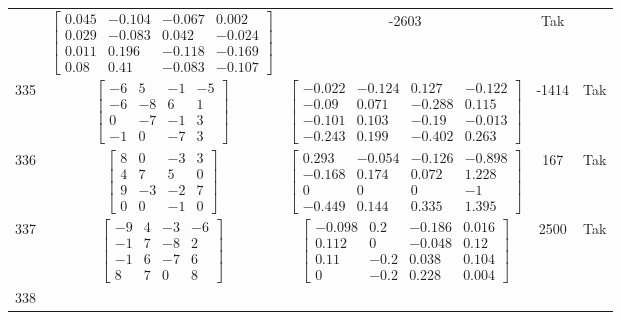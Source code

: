 \documentclass[a4paper,12pt]{article}
\begin{document}
\begin{tabular}{c c c c c}
&
$\begin{bmatrix} 0.045 & -0.104 & -0.067 & 0.002 \\ 0.029 & -0.083 & 0.042 & -0.024 \\ 0.011 & 0.196 & -0.118 & -0.169 \\ 0.08 & 0.41 & -0.083 & -0.107 \end{bmatrix}$
&
-2603
&
Tak
\\
335
&
$\begin{bmatrix} -6 & 5 & -1 & -5 \\ -6 & -8 & 6 & 1 \\ 0 & -7 & -1 & 3 \\ -1 & 0 & -7 & 3 \end{bmatrix}$
&
$\begin{bmatrix} -0.022 & -0.124 & 0.127 & -0.122 \\ -0.09 & 0.071 & -0.288 & 0.115 \\ -0.101 & 0.103 & -0.19 & -0.013 \\ -0.243 & 0.199 & -0.402 & 0.263 \end{bmatrix}$
&
-1414
&
Tak
\\
336
&
$\begin{bmatrix} 8 & 0 & -3 & 3 \\ 4 & 7 & 5 & 0 \\ 9 & -3 & -2 & 7 \\ 0 & 0 & -1 & 0 \end{bmatrix}$
&
$\begin{bmatrix} 0.293 & -0.054 & -0.126 & -0.898 \\ -0.168 & 0.174 & 0.072 & 1.228 \\ 0 & 0 & 0 & -1 \\ -0.449 & 0.144 & 0.335 & 1.395 \end{bmatrix}$
&
167
&
Tak
\\
337
&
$\begin{bmatrix} -9 & 4 & -3 & -6 \\ -1 & 7 & -8 & 2 \\ -1 & 6 & -7 & 6 \\ 8 & 7 & 0 & 8 \end{bmatrix}$
&
$\begin{bmatrix} -0.098 & 0.2 & -0.186 & 0.016 \\ 0.112 & 0 & -0.048 & 0.12 \\ 0.11 & -0.2 & 0.038 & 0.104 \\ 0 & -0.2 & 0.228 & 0.004 \end{bmatrix}$
&
2500
&
Tak
\\
338

\end{tabular}
\end{document}
